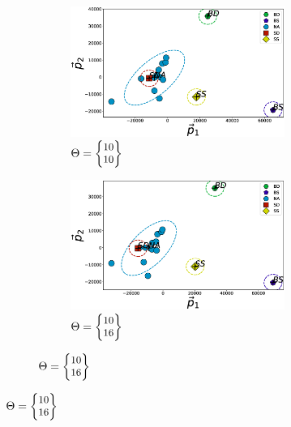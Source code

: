 \begin{figure}[]
	\centering
	\begin{subfigure}[b]{\textwidth}
		\begin{subfigure}[b]{.48\textwidth}
			\includegraphics[width=\textwidth]{./figs/phantom1properties_clsplt_Rotate-d100-r100.eps}
			\caption{$\Theta = \small{\begin{Bmatrix}10\\ 10\end{Bmatrix}}$}
			\label{ResRot:100-100}
		\end{subfigure} 
		\hspace{0.01\textwidth}
		\begin{subfigure}[b]{0.48\textwidth}
			\includegraphics[width=\textwidth]{./figs/phantom1properties_clsplt_Rotate-d100-r160.eps}
			\caption{$\Theta = \small{\begin{Bmatrix}10\\ 16\end{Bmatrix}}$}
			\label{ResRot:100-160}
		\end{subfigure}

\end{subfigure}
\end{figure}
